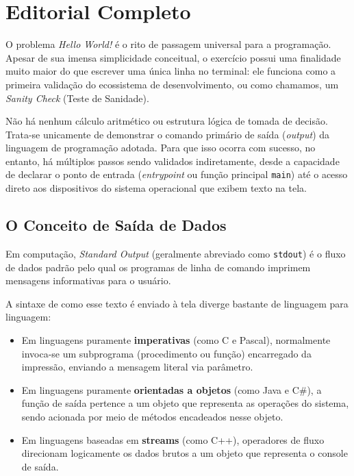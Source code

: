 \documentclass{article}
\begin{document}

\section*{Editorial Completo}

O problema \textit{Hello World!} é o rito de passagem universal para a programação. Apesar de sua imensa simplicidade conceitual, o exercício possui uma finalidade muito maior do que escrever uma única linha no terminal: ele funciona como a primeira validação do ecossistema de desenvolvimento, ou como chamamos, um \textit{Sanity Check} (Teste de Sanidade). 

Não há nenhum cálculo aritmético ou estrutura lógica de tomada de decisão. Trata-se unicamente de demonstrar o comando primário de saída (\textit{output}) da linguagem de programação adotada. Para que isso ocorra com sucesso, no entanto, há múltiplos passos sendo validados indiretamente, desde a capacidade de declarar o ponto de entrada (\textit{entrypoint} ou função principal \texttt{main}) até o acesso direto aos dispositivos do sistema operacional que exibem texto na tela.

\subsection*{O Conceito de Saída de Dados}

Em computação, \textit{Standard Output} (geralmente abreviado como \texttt{stdout}) é o fluxo de dados padrão pelo qual os programas de linha de comando imprimem mensagens informativas para o usuário. 

A sintaxe de como esse texto é enviado à tela diverge bastante de linguagem para linguagem:
\begin{itemize}
    \item Em linguagens puramente \textbf{imperativas} (como C e Pascal), normalmente invoca-se um subprograma (procedimento ou função) encarregado da impressão, enviando a mensagem literal via parâmetro.
    \item Em linguagens puramente \textbf{orientadas a objetos} (como Java e C\#), a função de saída pertence a um objeto que representa as operações do sistema, sendo acionada por meio de métodos encadeados nesse objeto.
    \item Em linguagens baseadas em \textbf{streams} (como C++), operadores de fluxo direcionam logicamente os dados brutos a um objeto que representa o console de saída.
\end{itemize}
\end{document}
